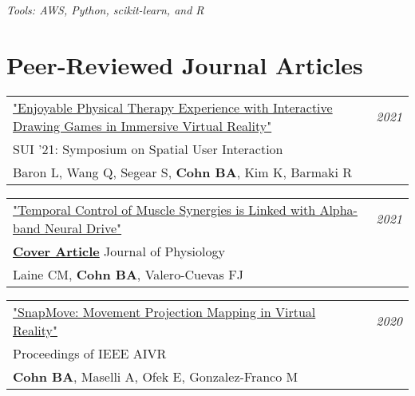 \documentclass[10pt,a4paper]{article}
\begin{document}
  \vspace*{2mm}\setlength\parindent{2mm}\begin{minipage}{16.8cm}
    \textit{Tools: AWS, Python, scikit-learn, and R} 
  \end{minipage}


\vspace*{3mm}\section*{Peer-Reviewed Journal Articles}



\vspace*{1mm}\noindent\begin{tabularx}{17cm}{X r}
  \href{https://github.com/bc/resume/raw/master/papers/baron_et_al_vr_enjoyable_SUI_2021.pdf}{"Enjoyable Physical Therapy Experience with Interactive Drawing Games in Immersive Virtual Reality"} & \textit{2021}\\
   SUI '21: Symposium on Spatial User Interaction \\
   Baron L, Wang Q, Segear S, \textbf{Cohn BA}, Kim K, Barmaki R\\[2mm]
\end{tabularx}




\vspace*{1mm}\noindent\begin{tabularx}{17cm}{X r}
  \href{https://github.com/bc/resume/raw/master/papers/Laine_Cohn_Valero-Cuevas_JPhys2021.pdf}{"Temporal Control of Muscle Synergies is Linked with Alpha-band Neural Drive"} & \textit{2021}\\
   \href{https://doi.org/10.1113/JP281232}{\textbf{Cover Article}} Journal of Physiology\\
   Laine CM, \textbf{Cohn BA}, Valero-Cuevas FJ\\[2mm]
\end{tabularx}

\vspace*{1mm}\noindent\begin{tabularx}{17cm}{X r}
   \href{https://github.com/bc/resume/raw/master/papers/cohn_et_al_aivr_2020_snapmov.pdf}{"SnapMove: Movement Projection Mapping in Virtual Reality"} & \textit{2020}\\
   Proceedings of IEEE AIVR \\
   \textbf{Cohn BA}, Maselli A, Ofek E, Gonzalez-Franco M\\[2mm]
\end{tabularx}
\end{document}
